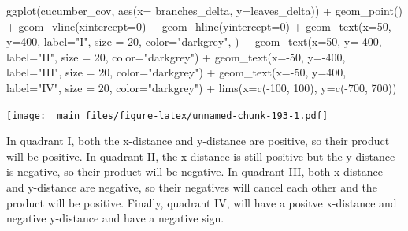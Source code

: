 \documentclass[
]{book}
\newenvironment{Shaded}{\begin{snugshade}}{\end{snugshade}}
\newcommand{\AttributeTok}[1]{\textcolor[rgb]{0.77,0.63,0.00}{#1}}
\newcommand{\DecValTok}[1]{\textcolor[rgb]{0.00,0.00,0.81}{#1}}
\newcommand{\FunctionTok}[1]{\textcolor[rgb]{0.00,0.00,0.00}{#1}}
\newcommand{\NormalTok}[1]{#1}
\newcommand{\SpecialCharTok}[1]{\textcolor[rgb]{0.00,0.00,0.00}{#1}}
\newcommand{\StringTok}[1]{\textcolor[rgb]{0.31,0.60,0.02}{#1}}
\begin{document}
\begin{Shaded}
\begin{Highlighting}[]
\FunctionTok{ggplot}\NormalTok{(cucumber\_cov, }\FunctionTok{aes}\NormalTok{(}\AttributeTok{x=}\NormalTok{ branches\_delta, }\AttributeTok{y=}\NormalTok{leaves\_delta)) }\SpecialCharTok{+}
  \FunctionTok{geom\_point}\NormalTok{() }\SpecialCharTok{+}
  \FunctionTok{geom\_vline}\NormalTok{(}\AttributeTok{xintercept=}\DecValTok{0}\NormalTok{) }\SpecialCharTok{+}
  \FunctionTok{geom\_hline}\NormalTok{(}\AttributeTok{yintercept=}\DecValTok{0}\NormalTok{) }\SpecialCharTok{+}
  \FunctionTok{geom\_text}\NormalTok{(}\AttributeTok{x=}\DecValTok{50}\NormalTok{, }\AttributeTok{y=}\DecValTok{400}\NormalTok{, }\AttributeTok{label=}\StringTok{"I"}\NormalTok{, }\AttributeTok{size =} \DecValTok{20}\NormalTok{, }\AttributeTok{color=}\StringTok{"darkgrey"}\NormalTok{, ) }\SpecialCharTok{+}
  \FunctionTok{geom\_text}\NormalTok{(}\AttributeTok{x=}\DecValTok{50}\NormalTok{, }\AttributeTok{y=}\SpecialCharTok{{-}}\DecValTok{400}\NormalTok{, }\AttributeTok{label=}\StringTok{"II"}\NormalTok{, }\AttributeTok{size =} \DecValTok{20}\NormalTok{, }\AttributeTok{color=}\StringTok{"darkgrey"}\NormalTok{) }\SpecialCharTok{+}
  \FunctionTok{geom\_text}\NormalTok{(}\AttributeTok{x=}\SpecialCharTok{{-}}\DecValTok{50}\NormalTok{, }\AttributeTok{y=}\SpecialCharTok{{-}}\DecValTok{400}\NormalTok{, }\AttributeTok{label=}\StringTok{"III"}\NormalTok{, }\AttributeTok{size =} \DecValTok{20}\NormalTok{, }\AttributeTok{color=}\StringTok{"darkgrey"}\NormalTok{) }\SpecialCharTok{+}
  \FunctionTok{geom\_text}\NormalTok{(}\AttributeTok{x=}\SpecialCharTok{{-}}\DecValTok{50}\NormalTok{, }\AttributeTok{y=}\DecValTok{400}\NormalTok{, }\AttributeTok{label=}\StringTok{"IV"}\NormalTok{, }\AttributeTok{size =} \DecValTok{20}\NormalTok{, }\AttributeTok{color=}\StringTok{"darkgrey"}\NormalTok{) }\SpecialCharTok{+}
  \FunctionTok{lims}\NormalTok{(}\AttributeTok{x=}\FunctionTok{c}\NormalTok{(}\SpecialCharTok{{-}}\DecValTok{100}\NormalTok{, }\DecValTok{100}\NormalTok{), }\AttributeTok{y=}\FunctionTok{c}\NormalTok{(}\SpecialCharTok{{-}}\DecValTok{700}\NormalTok{, }\DecValTok{700}\NormalTok{))}
\end{Highlighting}
\end{Shaded}

\texttt{[image: \_main\_files/figure-latex/unnamed-chunk-193-1.pdf]}

In quadrant I, both the x-distance and y-distance are positive, so their product will be positive. In quadrant II, the x-distance is still positive but the y-distance is negative, so their product will be negative. In quadrant III, both x-distance and y-distance are negative, so their negatives will cancel each other and the product will be positive. Finally, quadrant IV, will have a positve x-distance and negative y-distance and have a negative sign.
\end{document}
